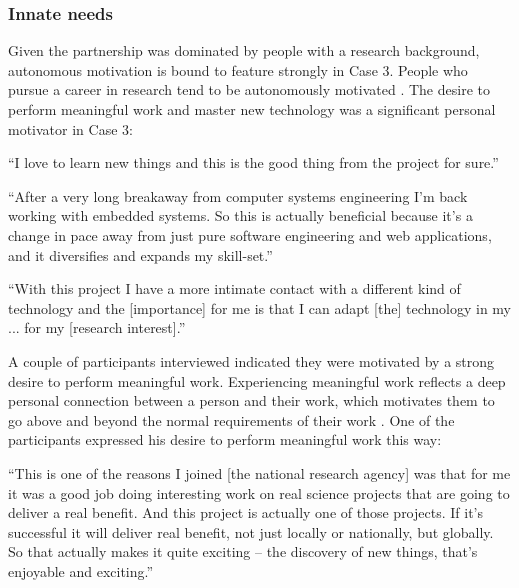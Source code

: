 \subsubsection{Innate needs}

Given the partnership was dominated by people with a research background, autonomous motivation is bound to feature strongly in Case 3. People who pursue a career in research tend to be autonomously motivated \citep{ryan2014work,suominen2021gold}. The desire to perform meaningful work and master new technology was a significant personal motivator in Case 3:

\begin{displayquote}[Participant 9/3]
\small
\enquote{I love to learn new things and this is the good thing from the project for sure.} 
\end{displayquote}

\begin{displayquote}[Participant 16/3]
\small
\enquote{After a very long breakaway from computer systems engineering I'm back working with embedded systems. So this is actually beneficial because it's a change in pace away from just pure software engineering and web applications, and it diversifies and expands my skill-set.} 
\end{displayquote}

\begin{displayquote}[Participant 39/3]
\small
\enquote{With this project I have a more intimate contact with a different kind of technology and the [importance] for me is that I can adapt [the] technology in my ... for my [research interest].} 
\end{displayquote}

A couple of participants interviewed indicated they were motivated by a strong desire to perform meaningful work. Experiencing meaningful work reflects a deep personal connection between a person and their work, which motivates them to go above and beyond the normal requirements of their work \citep{van2018motivational}. One of the participants expressed his desire to perform meaningful work this way:

\begin{displayquote}[Participant 16/3]
\small
\enquote{This is one of the reasons I joined [the national research agency] was that for me it was a good job doing interesting work on real science projects that are going to deliver a real benefit. And this project is actually one of those projects. If it's successful it will deliver real benefit, not just locally or nationally, but globally. So that actually makes it quite exciting -- the discovery of new things, that's enjoyable and exciting.} 
\end{displayquote}
 
